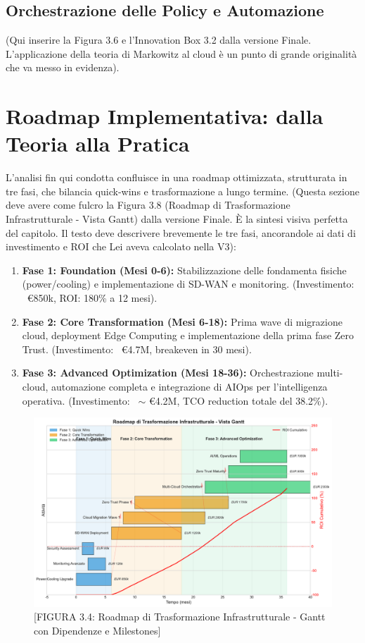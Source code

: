 \begin{refsection}
\subsection{Orchestrazione delle Policy e Automazione}



(Qui inserire la Figura 3.6 e l'Innovation Box 3.2 dalla versione Finale. L'applicazione della teoria di Markowitz al cloud è un punto di grande originalità che va messo in evidenza).
\section{ Roadmap Implementativa: dalla Teoria alla Pratica}
L'analisi fin qui condotta confluisce in una roadmap ottimizzata, strutturata in tre fasi\autocite{Capgemini2024}, che bilancia quick-wins e trasformazione a lungo termine.\autocite{Vose2008}
(Questa sezione deve avere come fulcro la Figura 3.8 (Roadmap di Trasformazione Infrastrutturale - Vista Gantt) dalla versione Finale. È la sintesi visiva perfetta del capitolo. Il testo deve descrivere brevemente le tre fasi, ancorandole ai dati di investimento e ROI che Lei aveva calcolato nella V3):
\begin{enumerate}
    \item \textbf{Fase 1: Foundation (Mesi 0-6):} Stabilizzazione delle fondamenta fisiche (power/cooling) e implementazione di SD-WAN e monitoring. (Investimento: ~€850k, ROI: 180\% a 12 mesi).
    \item \textbf{Fase 2: Core Transformation (Mesi 6-18):} Prima wave di migrazione cloud, deployment Edge Computing e implementazione della prima fase Zero Trust. (Investimento: ~€4.7M, breakeven in 30 mesi).
    \item \textbf{Fase 3: Advanced Optimization (Mesi 18-36):} Orchestrazione multi-cloud, automazione completa e integrazione di AIOps per l'intelligenza operativa. (Investimento: ~$\sim$ €4.2M, TCO reduction totale del 38.2\%).
\end{enumerate}

\begin{figure}[htbp]
\centering
\includegraphics[width=1\textwidth]{thesis_figures/cap3/figura_3_4_roadmap.pdf}
\caption{[FIGURA 3.4: Roadmap di Trasformazione Infrastrutturale - Gantt con Dipendenze e Milestones]}
\label{fig:roadmap_transformation}
\end{figure}


\end{refsection}
